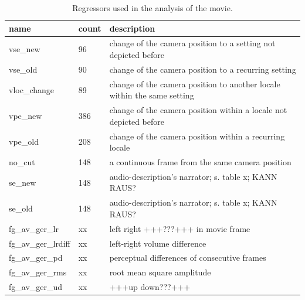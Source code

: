 \documentclass[english]{article}
\begin{document}
\begin{table}
\caption{Regressors used in the analysis of the movie.}
\begin{tabular}{lll}
\toprule
\textbf{name} & \textbf{count} & \textbf{description} \\
\midrule
vse\_new & 96 & change of the camera position to a setting not depicted before \\
vse\_old & 90 & change of the camera position to a recurring setting \\
vloc\_change & 89 & change of the camera position to another locale within the same setting \\
vpe\_new & 386 & change of the camera position within a locale not depicted before \\
vpe\_old & 208 & change of the camera position within a recurring locale \\
no\_cut & 148 & a continuous frame from the same camera position \\
se\_new & 148 & audio-description's narrator; s. table x; KANN RAUS? \\
se\_old & 148 & audio-description's narrator; s. table x; KANN RAUS? \\
fg\_av\_ger\_lr & xx & left right +++???+++ in movie frame  \\
fg\_av\_ger\_lrdiff & xx & left-right volume difference \\
fg\_av\_ger\_pd & xx & perceptual differences of consecutive frames \\
fg\_av\_ger\_rms & xx & root mean square amplitude \\
fg\_av\_ger\_ud & xx & +++up down???+++ \\
\bottomrule
\end{tabular}
\end{table}
\end{document}
